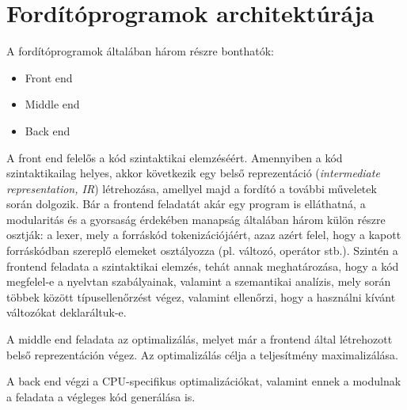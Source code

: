 \section{Fordítóprogramok architektúrája}
A fordítóprogramok általában három részre bonthatók:
\begin{itemize}
	\item Front end
	\item Middle end
	\item Back end
\end{itemize}
A front end felelős a kód szintaktikai elemzéséért. Amennyiben a kód szintaktikailag helyes, akkor következik egy belső reprezentáció (\textit{intermediate representation, IR}) létrehozása, amellyel majd a fordító a további műveletek során dolgozik. Bár a frontend feladatát akár egy program is elláthatná, a modularitás és a gyorsaság érdekében manapság általában három külön részre osztják: a lexer, mely a forráskód tokenizációjáért, azaz azért felel, hogy a kapott forráskódban szereplő elemeket osztályozza (pl. változó, operátor stb.). Szintén a frontend feladata a szintaktikai elemzés, tehát annak meghatározása, hogy a kód megfelel-e a nyelvtan szabályainak, valamint a szemantikai analízis, mely során többek között típusellenőrzést végez, valamint ellenőrzi, hogy a használni kívánt változókat deklaráltuk-e.

A middle end feladata az optimalizálás, melyet már a frontend által létrehozott belső reprezentáción végez. Az optimalizálás célja a teljesítmény maximalizálása.

A back end végzi a CPU-specifikus optimalizációkat, valamint ennek a modulnak a feladata a végleges kód generálása is.